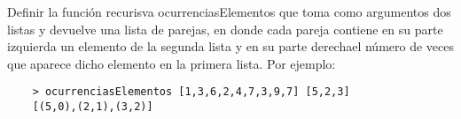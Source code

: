 Definir la función recurisva ocurrenciasElementos que toma
como argumentos dos listas y devuelve una lista de parejas, 
en donde cada pareja contiene en su parte izquierda un elemento 
de la segunda lista y en su parte derechael número de veces que 
aparece dicho elemento en la primera lista. Por ejemplo:

\begin{verbatim}
    > ocurrenciasElementos [1,3,6,2,4,7,3,9,7] [5,2,3]
    [(5,0),(2,1),(3,2)]
\end{verbatim}